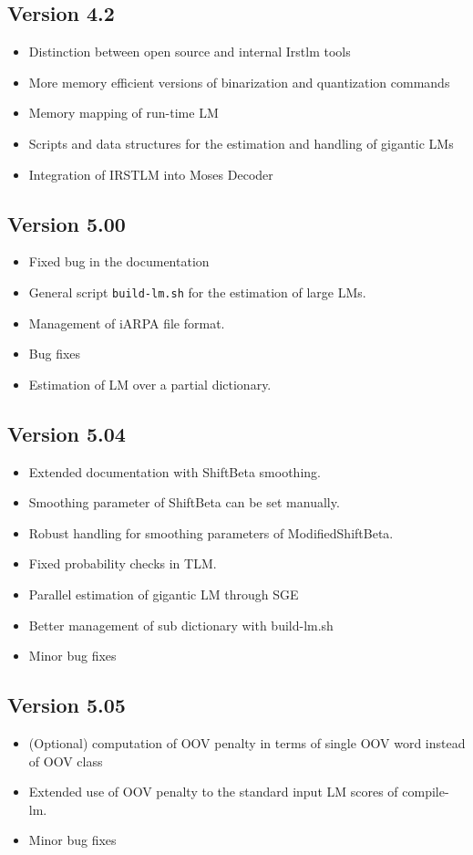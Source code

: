 \documentclass[11pt]{article}
\begin{document}
\subsection{Version 4.2}
\begin{itemize}
\item Distinction between open source and internal Irstlm tools
\item More memory efficient versions of binarization and quantization commands
\item Memory mapping of run-time LM
\item Scripts and data structures for the estimation and handling of gigantic LMs 
\item Integration of IRSTLM into Moses Decoder
\end{itemize}

\subsection{Version 5.00}
\begin{itemize}
\item Fixed bug in the documentation 
\item General script {\tt build-lm.sh} for the estimation of large LMs.
\item Management of iARPA file format.
\item Bug fixes
\item Estimation of LM over a partial dictionary.
\end{itemize}


\subsection{Version 5.04}
\begin{itemize}
\item Extended documentation with ShiftBeta smoothing. 
\item Smoothing parameter of ShiftBeta can be set manually.
\item Robust handling for smoothing parameters of ModifiedShiftBeta.
\item Fixed probability checks in TLM.
\item Parallel estimation of gigantic LM through SGE
\item Better management of sub dictionary with build-lm.sh   
\item Minor bug fixes
\end{itemize}

\subsection{Version 5.05}
\begin{itemize}
\item (Optional) computation of OOV penalty in terms of single OOV word instead of OOV class
\item Extended use of OOV penalty to the standard input LM scores of compile-lm. 
\item Minor bug fixes
\end{itemize}
\end{document}
